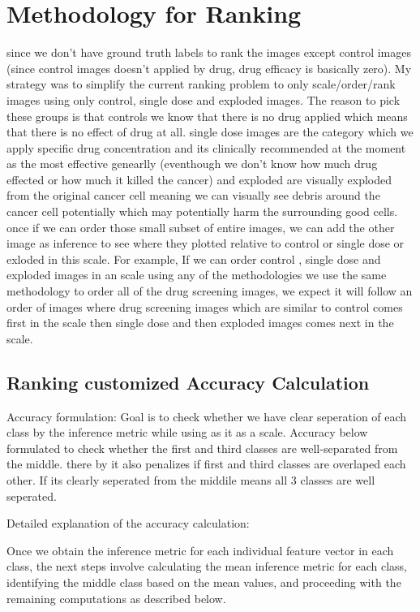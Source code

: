 \chapter{Methodology for Ranking}\label{ch:Methodology for Ranking}
 
since we don't have ground truth labels to rank the images except control images (since control images doesn't applied by drug, drug efficacy is basically zero).
My strategy was to simplify the current ranking problem to only scale/order/rank images 
using only control, single dose and exploded images.
The reason to pick these groups is that controls we know that there is no drug applied which means that there is no effect of drug at all. 
single dose images are the category which we apply specific drug concentration and its clinically recommended at the moment as the most effective genearlly (eventhough we don't know how much drug effected or how 
much it killed the cancer) 
and exploded are visually exploded from the original cancer cell meaning we can visually see debris around the cancer cell potentially which may potentially harm the surrounding good cells.
once if we can order those small subset of entire images, we can add the other image as inference to see where they plotted relative to control or single dose or exloded in this scale. For example, If we can order control , single dose and exploded images in an scale using any of the methodologies we use the same methodology to order all of the drug screening images, we expect it will follow an order of images  where drug screening images which are similar to control comes first in the scale then single dose and then exploded images comes next in the scale.

\section*{Ranking customized Accuracy Calculation}

Accuracy formulation: Goal is to check whether we have clear seperation of each class by the inference metric while using as it as a scale. Accuracy below formulated to check whether the first and third classes are well-separated from the middle. there by it also penalizes if first and third classes are overlaped each other. If its clearly seperated from the middile means all 3 classes  are well seperated. 

Detailed explanation of the accuracy calculation:

Once we obtain the inference metric for each individual feature vector in each class, the next steps involve calculating the mean inference metric for each class, identifying the middle class based on the mean values, and proceeding with the remaining computations as described below.


